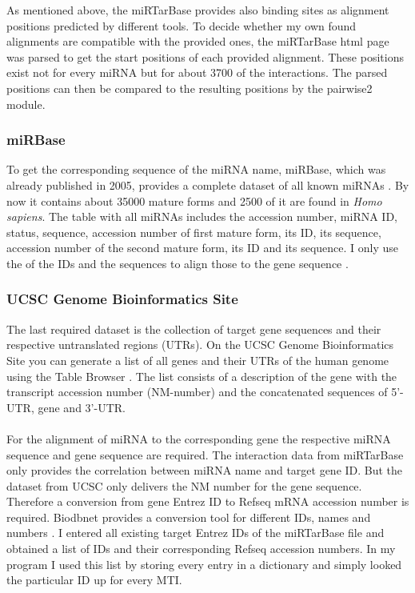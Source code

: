 \documentclass[12pt]{article}
\begin{document}
As mentioned above, the miRTarBase provides also binding sites as alignment positions predicted by different tools. To decide whether my own found alignments are compatible with the provided ones, the miRTarBase html page was parsed to get the start positions of each provided alignment. These positions exist not for every miRNA but for about 3700 of the interactions. The parsed positions can then be compared to the resulting positions by the pairwise2 module. 

\subsubsection{miRBase}
To get the corresponding sequence of the miRNA name, miRBase, which was already published in 2005, provides a complete dataset of all known miRNAs \cite{Griffiths-Jones}. By now it contains about 35000 mature forms and 2500 of it are found in \textit{Homo sapiens}. The table with all miRNAs includes the accession number, miRNA ID, status, sequence, accession number of first mature form, its ID, its sequence, accession number of the second mature form, its ID and its sequence. I only use the of the IDs and the sequences to align those to the gene sequence \cite{mirbase}.

 
\subsubsection{UCSC Genome Bioinformatics Site}
The last required dataset is the collection of target gene sequences and their respective untranslated regions (UTRs). On the UCSC Genome Bioinformatics Site you can generate a list of all genes and their UTRs of the human genome using the Table Browser \cite{ucsc}. The list consists of a description of the gene with the transcript accession number (NM-number) and the concatenated sequences of 5'-UTR, gene and 3'-UTR.\\\\

For the alignment of miRNA to the corresponding gene the respective miRNA sequence and gene sequence are required. The interaction data from miRTarBase only provides the correlation between miRNA name and target gene ID. But the dataset from UCSC only delivers the NM number for the gene sequence. Therefore a conversion from gene Entrez ID to Refseq mRNA accession number is required. Biodbnet provides a conversion tool for different IDs, names and numbers \cite{biodb}. I entered all existing target Entrez IDs of the miRTarBase file and obtained a list of IDs and their corresponding Refseq accession numbers. In my program I used this list by storing every entry in a dictionary and simply looked the particular ID up for every MTI. 
 
\end{document}
